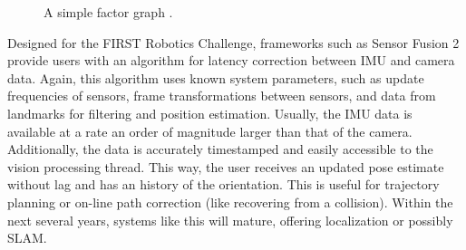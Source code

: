 \documentclass{article}
\begin{document}
\begin{figure}[H]
  \centering
  \label{fig:ex_factor_graph}
  \caption{A simple factor graph \cite{hwymeers_example}.}
\end{figure}

	Designed for the FIRST Robotics Challenge, frameworks such as Sensor Fusion 2 provide users with an algorithm for latency correction between IMU and camera data. Again, this algorithm uses known system parameters, such as update frequencies of sensors, frame transformations between sensors, and data from landmarks for filtering and position estimation. Usually, the IMU data is available at a rate an order of magnitude larger than that of the camera. Additionally, the data is accurately timestamped and easily accessible to the vision processing thread. This way, the user receives an updated pose estimate without lag and has an history of the orientation. This is useful for trajectory planning or on-line path correction (like recovering from a collision). Within the next several years, systems like this will mature, offering localization or possibly SLAM.
\end{document}
